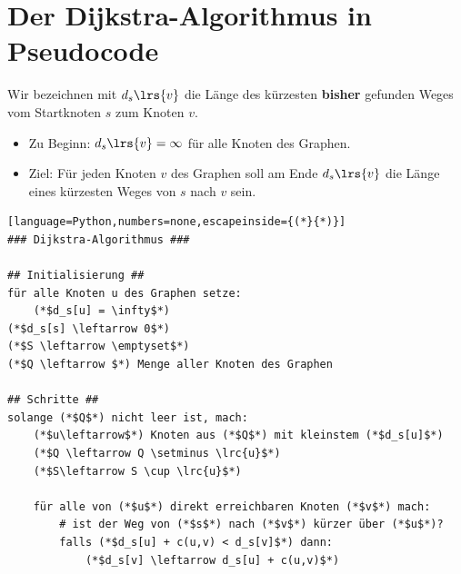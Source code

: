 \section{Der Dijkstra-Algorithmus in Pseudocode}
Wir bezeichnen mit $d_s\lrs{v}$ die Länge des kürzesten \textbf{bisher} gefunden Weges vom Startknoten $s$ zum Knoten $v$.
\begin{itemize}
	\item Zu Beginn: $d_s\lrs{v} = \infty$ für alle Knoten des Graphen.
	\item Ziel: Für jeden Knoten $v$ des Graphen soll am Ende $d_s\lrs{v}$ die Länge eines kürzesten Weges von $s$ nach $v$ sein.
\end{itemize}
\begin{lstlisting}[language=Python,numbers=none,escapeinside={(*}{*)}]
### Dijkstra-Algorithmus ###

## Initialisierung ##
für alle Knoten u des Graphen setze:
    (*$d_s[u] = \infty$*)
(*$d_s[s] \leftarrow 0$*)
(*$S \leftarrow \emptyset$*)
(*$Q \leftarrow $*) Menge aller Knoten des Graphen

## Schritte ##
solange (*$Q$*) nicht leer ist, mach:
    (*$u\leftarrow$*) Knoten aus (*$Q$*) mit kleinstem (*$d_s[u]$*)
    (*$Q \leftarrow Q \setminus \lrc{u}$*)
    (*$S\leftarrow S \cup \lrc{u}$*)

    für alle von (*$u$*) direkt erreichbaren Knoten (*$v$*) mach:
        # ist der Weg von (*$s$*) nach (*$v$*) kürzer über (*$u$*)?
        falls (*$d_s[u] + c(u,v) < d_s[v]$*) dann:
            (*$d_s[v] \leftarrow d_s[u] + c(u,v)$*)
\end{lstlisting}

\shipoutAnswer